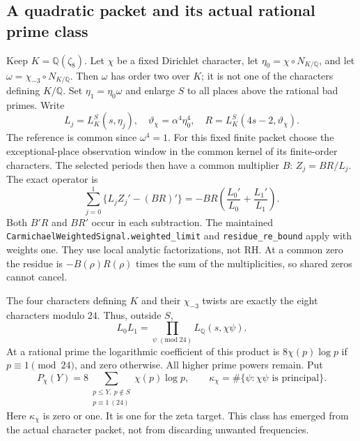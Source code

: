 \documentclass[11pt]{article}
\begin{document}
\subsection{A quadratic packet and its actual rational prime class}
Keep $K=\mathbb Q(\zeta_8)$. Let $\chi$ be a fixed Dirichlet character,
let $\eta_0=\chi\circ N_{K/\mathbb Q}$, and let
$\omega=\chi_{-3}\circ N_{K/\mathbb Q}$. Then $\omega$ has order two
over $K$; it is not one of the characters defining $K/\mathbb Q$.
Set $\eta_1=\eta_0\omega$ and enlarge $S$ to all places above the
rational bad primes. Write
\[
 L_j=L_K^S(s,\eta_j),\quad
 \vartheta_\chi=\alpha^4\eta_0^4,\quad
 R=L_K^S(4s-2,\vartheta_\chi).
\]
The reference is common since $\omega^4=1$.
For this fixed finite packet choose the exceptional-place observation
window in the common kernel of its finite-order characters.
The selected periods then have a common multiplier $B$:
$Z_j=BR/L_j$. The exact operator is
\begin{equation}\label{eq:quartic-log-companion}
 \sum_{j=0}^1\{L_jZ_j'-(BR)'\}
       =-BR\left(\frac{L_0'}{L_0}+\frac{L_1'}{L_1}\right).
\end{equation}
Both $B'R$ and $BR'$ occur in each subtraction.
The maintained \texttt{CarmichaelWeightedSignal.weighted\_limit}
and \texttt{residue\_re\_bound} apply with weights one.
They use local analytic factorizations, not RH. At a common zero
the residue is $-B(\rho)R(\rho)$ times the sum of the multiplicities,
so shared zeros cannot cancel.

The four characters defining $K$ and their $\chi_{-3}$ twists
are exactly the eight characters modulo $24$. Thus, outside $S$,
\[
 L_0L_1=\prod_{\psi\;(\mathrm{mod}\;24)}L_{\mathbb Q}(s,\chi\psi).
\]
At a rational prime the logarithmic coefficient of this product is
$8\chi(p)\log p$ if $p\equiv1\pmod{24}$, and zero otherwise.
All higher prime powers remain. Put
\[
 P_\chi(Y)=8\sum_{\substack{p\le Y,\ p\notin S\\p\equiv1\ (24)}}
                          \chi(p)\log p,\qquad
 \kappa_\chi=\#\{\psi:\chi\psi\text{ is principal}\}.
\]
Here $\kappa_\chi$ is zero or one. It is one for the zeta target.
This class has emerged from the actual character packet, not from
discarding unwanted frequencies.
\end{document}
